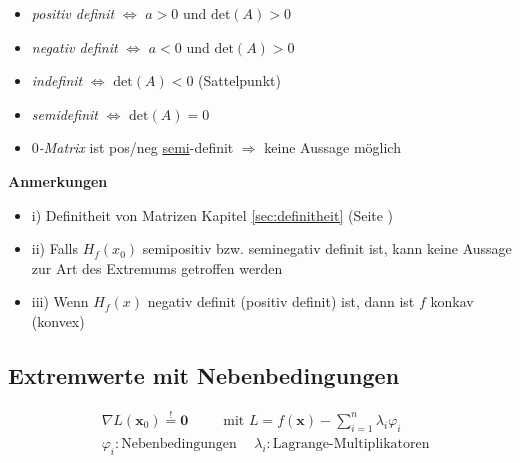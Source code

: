 \documentclass[8pt, a4paper, landscape, fleqn]{scrartcl}
\newenvironment {annotation}[1]
				{\begin{itshape} \begin{small} \textbf{#1} \begin{itemize}}
				{\end{itemize} \end{small} \end{itshape}}
\begin{document}
\begin{multicols*}{3}
\begin{enumerate}
					    \begin{itemize}
						    \item	\emph{positiv definit} \(\Longleftrightarrow\) \(a>0\) und \(\text{det}(A)>0\)
						    \item	\emph{negativ definit} \(\Longleftrightarrow\) \(a<0\) und \(\text{det}(A)>0\)
						    \item	\emph{indefinit} \(\Longleftrightarrow\) \(\text{det}(A)<0\) (Sattelpunkt)
						    \item	\emph{semidefinit}     \(\Longleftrightarrow\)     \(\text{det}(A)=0\)
						    \item   $0$\emph{-Matrix} ist pos/neg \underline{semi}-definit $\Rightarrow$ keine Aussage möglich
					    \end{itemize}
					\end{enumerate}
					\begin{annotation}{Anmerkungen}
						\item[i)] Definitheit von Matrizen Kapitel \ref{sec:definitheit} (Seite \pageref{sec:definitheit})
						\item[ii)] Falls $H_f(x_0)$ semipositiv bzw. seminegativ definit ist, kann keine Aussage zur Art des Extremums getroffen werden
						\item[iii)] Wenn $H_f(x)$ negativ definit (positiv definit) ist, dann ist $f$ konkav (konvex)
					\end{annotation}
			\subsection{Extremwerte mit Nebenbedingungen}
				\begin{align*}
					&\nabla L(\textbf{x}_0) \overset{!}{=} \textbf{0} \hspace{30pt} \text{mit } L=f(\textbf{x})-\sum_{i=1}^{n}\lambda_i \varphi_i\\
					&\varphi_i :\text{Nebenbedingungen} \hspace{15pt} \lambda_i: \text{Lagrange-Multiplikatoren}
				\end{align*}

\end{multicols*}
\end{document}
